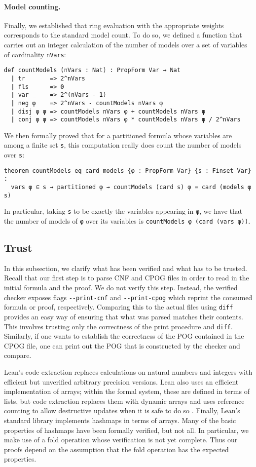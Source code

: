 \paragraph{Model counting.} Finally, we established that ring evaluation with the appropriate weights
corresponds to the standard model count. To do so, we defined a function that
carries out an integer calculation of the number of models over a set of variables
of cardinality \lstinline{nVars}:
\begin{lstlisting}
def countModels (nVars : Nat) : PropForm Var → Nat
  | tr       => 2^nVars
  | fls      => 0
  | var _    => 2^(nVars - 1)
  | neg φ    => 2^nVars - countModels nVars φ
  | disj φ ψ => countModels nVars φ + countModels nVars ψ
  | conj φ ψ => countModels nVars φ * countModels nVars ψ / 2^nVars
\end{lstlisting}
We then formally proved that for a partitioned formula whose variables are among a finite set
\lstinline{s}, this computation really does count the number of models over \lstinline{s}:
\begin{lstlisting}
theorem countModels_eq_card_models {φ : PropForm Var} {s : Finset Var} :
  vars φ ⊆ s → partitioned φ → countModels (card s) φ = card (models φ s)
\end{lstlisting}
In particular, taking \lstinline{s} to be exactly the variables appearing in \lstinline{φ},
we have that the number of models of \lstinline{φ} over its variables is
\lstinline{countModels φ (card (vars φ))}.

\subsection{Trust}
In this subsection, we clarify what has been verified and what has to be trusted.
Recall that our first step is to parse CNF and CPOG files in order to read in the initial
formula and the proof. We do not verify this step. Instead, the verified checker exposes
flags \verb+--print-cnf+ and \verb+--print-cpog+ which reprint the consumed formula or proof,
respectively. Comparing this to the actual files using {\tt diff} provides an easy way of ensuring
that what was parsed matches their contents. This involves trusting only the correctness of the
print procedure and {\tt diff}. Similarly, if one wants to establish the correctness of the POG
contained in the CPOG file, one can print out the POG that is constructed by the checker and compare.

Lean's code extraction replaces calculations on natural numbers and integers with
efficient but unverified arbitrary precision versions.
Lean also uses an efficient implementation of arrays; within the
formal system, these are defined in terms of lists, but code extraction replaces them
with dynamic arrays and uses reference counting to allow destructive updates when it is safe
to do so \cite{Ullrich:de:Moura:19}.
Finally, Lean's standard library implements hashmaps in terms of arrays.
Many of the basic properties of hashmaps have been formally verified, but not all.
In particular, we make use of a fold operation whose verification is not yet complete.
Thus our proofs depend on the assumption that the fold operation has the
expected properties.

